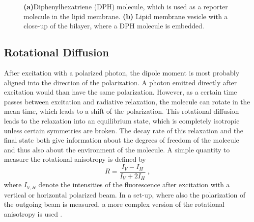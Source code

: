 \documentclass{scrartcl}
\numberwithin{equation}{section}
\numberwithin{figure}{section}
\numberwithin{table}{section}
\newcommand{\eq}[2]{\begin{equation}#1\label{#2}\end{equation}}
\begin{document}
\begin{figure}
\centering
{}
\caption{ \small \textbf{(a)}Diphenylhexatriene (DPH) molecule, which is used as a reporter molecule in the lipid membrane. \textbf{(b)} Lipid membrane vesicle with a close-up of the bilayer, where a DPH molecule is embedded.}
\label{dph}
\end{figure}



\subsection{Rotational Diffusion}
After excitation with a polarized photon, the dipole moment is most probably aligned into the direction of the polarization. A photon emitted directly after excitation would than have the same polarization. However, as a certain time passes between excitation and radiative relaxation, the molecule can rotate in the mean time, which leads to a shift of the polarization. This rotational diffusion leads to the relaxation into an equilibrium state, which is completely isotropic unless certain symmetries are broken. The decay rate of this relaxation and the final state both give information about the degrees of freedom of the molecule and thus also about the environment of the molecule. A simple quantity to measure the rotational anisotropy is defined by
\eq{R=\frac{I_V -I_H}{I_V + 2I_H} \; ,}{R}
where $I_{V,H}$ denote the intensities of the fluorescence after excitation with a vertical or horizontal polarized beam. In a set-up, where also the polarization of the outgoing beam is measured, a more complex version of the rotational anisotropy is used \cite{lako}.
\end{document}
